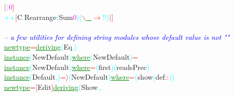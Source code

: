 \textcolor{red}{\ensuremath{|}}\hsspace \textcolor{cyan}{\ensuremath{\rangle}}\hsspace \textcolor{magenta}{0}\textcolor{red}{]}\\\hstab \hstab \textcolor{cyan}{++}\hsspace \textcolor{red}{[}{\rm{}C}\textcolor{cyan}{.}{\rm{}Rearrange}\hsspace \textcolor{cyan}{(}{\rm{}Sum}\hsspace \textcolor{magenta}{0}\textcolor{cyan}{)}\hsspace \textcolor{cyan}{(}\textcolor{red}{$\backslash$}\textcolor{green}{\underline{\_}}\hsspace \textcolor{red}{\ensuremath{\rightarrow}}\hsspace \textcolor{cyan}{!!}\textcolor{cyan}{)}\hsspace \textcolor{red}{\ensuremath{|}}\textcolor{red}{]}\\\\\textcolor{blue}{{\it{}-- a few utilities for defining string modules whose default value is not ""}}\\\textcolor{green}{\underline{newtype}}\hsspace \textcolor{red}{=}\hsspace \textcolor{green}{\underline{deriving}}\hsspace \textcolor{cyan}{(}{\rm{}Eq}\textcolor{cyan}{,}\textcolor{cyan}{)}\\\textcolor{green}{\underline{instance}}\hsspace \textcolor{cyan}{(}{\rm{}NewDefault}\textcolor{cyan}{)}\hsspace \textcolor{green}{\underline{where}}\hsspace \textcolor{cyan}{(}{\rm{}NewDefault}\textcolor{cyan}{)}\hsspace \textcolor{red}{=}\\\textcolor{green}{\underline{instance}}\hsspace \textcolor{cyan}{(}{\rm{}NewDefault}\textcolor{cyan}{)}\hsspace \textcolor{green}{\underline{where}}\hsspace \textcolor{red}{=}\hsspace \textcolor{cyan}{(}{\rm{}first}\textcolor{cyan}{)}\hsspace \textcolor{cyan}{(}{\rm{}readsPrec}\textcolor{cyan}{)}\\\textcolor{green}{\underline{instance}}\hsspace \textcolor{cyan}{(}{\rm{}Default}\textcolor{cyan}{,}\textcolor{cyan}{)}\hsspace \textcolor{red}{=\ensuremath{\rangle}}\hsspace \textcolor{cyan}{(}{\rm{}NewDefault}\textcolor{cyan}{)}\hsspace \textcolor{green}{\underline{where}}\hsspace \textcolor{red}{=}\hsspace \textcolor{cyan}{(}{\rm{}show}\hsspace \textcolor{cyan}{(}{\rm{}def}\hsspace \textcolor{red}{::}\textcolor{cyan}{)}\textcolor{cyan}{)}\\\textcolor{green}{\underline{newtype}}\hsspace \textcolor{red}{=}\hsspace \textcolor{red}{[}{\rm{}Edit}\textcolor{red}{]}\hsspace \textcolor{green}{\underline{deriving}}\hsspace \textcolor{cyan}{(}{\rm{}Show}\textcolor{cyan}{,}\textcolor{cyan}{,}\hsspace 